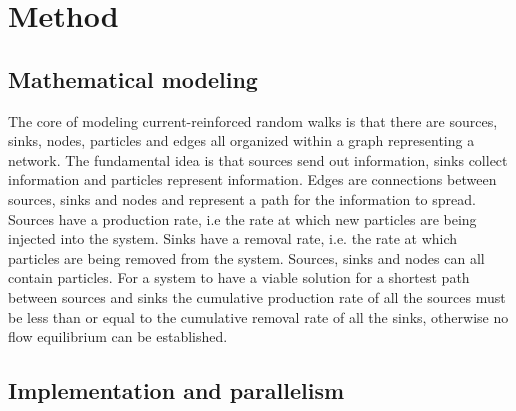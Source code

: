 \section{Method}
\label{sec:method}

\subsection{Mathematical modeling}
 The core of modeling current-reinforced random walks is that there are sources, sinks, nodes, particles and edges all organized within a graph representing a network. The fundamental idea is that sources send out information, sinks collect information and particles represent information. Edges are connections between sources, sinks and nodes and represent a path for the information to spread. Sources have a production rate, i.e the rate at which new particles are being injected into the system. Sinks have a removal rate, i.e. the rate at which particles are being removed from the system. Sources, sinks and nodes can all contain particles. For a system to have a viable solution for a shortest path between sources and sinks the cumulative production rate of all the sources must be less than or equal to the cumulative removal rate of all the sinks, otherwise no flow equilibrium can be established.
 
 \subsection{Implementation and parallelism}